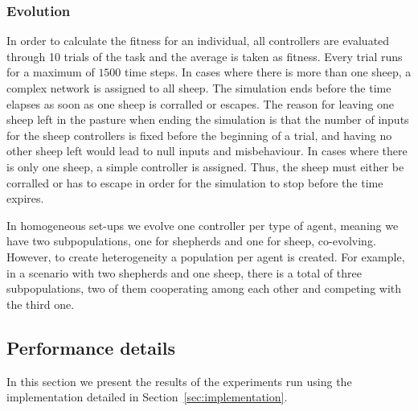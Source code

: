 \documentclass[conference]{IEEEtran}
\begin{document}
\subsubsection{Evolution}
In order to calculate the fitness for an individual, all controllers are evaluated through 10 trials of the task and the average is taken as fitness.
Every trial runs for a maximum of $1500$ time steps. 
In cases where there is more than one sheep, a complex network is assigned to all sheep. 
The simulation ends before the time elapses as soon as one sheep is corralled or escapes. 
The reason for leaving one sheep left in the pasture when ending the simulation is that the number of inputs for the sheep controllers is fixed before the beginning of a trial, and having no other sheep left would lead to null inputs and misbehaviour. 
In cases where there is only one sheep, a simple controller is assigned. 
Thus, the sheep must either be corralled or has to escape in order for the simulation to stop before the time expires.

In homogeneous set-ups we evolve one controller per type of agent, meaning we have two subpopulations, one for shepherds and one for sheep, co-evolving. 
However, to create heterogeneity a population per agent is created. 
For example, in a scenario with two shepherds and one sheep, there is a total of three subpopulations, two of them cooperating among each other and competing with the third one.  



\subsection{Performance details}
\label{sec:experiments_performances}
In this section we present the results of the experiments run using the implementation detailed in Section~\ref{sec:implementation}.
\vspace{0.5em}
\end{document}
